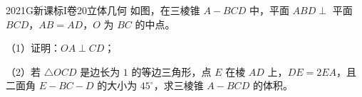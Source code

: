 
\begin{problem}{2021}{G}{新课标I卷}{20}{立体几何}
如图，在三棱锥 $ A-BCD $ 中，平面 $ ABD\perp $ 平面 $ BCD $，$ AB=AD $，$ O $ 为 $ BC $ 的中点。

（1）证明：$ OA\perp CD $；

（2）若 $ \triangle OCD $ 是边长为 $ 1 $ 的等边三角形，点 $ E $ 在棱 $ AD $ 上，$ DE=2EA $，且二面角 $ E-BC-D $ 的大小为 $ 45^\circ $，求三棱锥 $ A-BCD $ 的体积。
\end{problem}

\begin{answer}

\end{answer}

\begin{solutions}

\end{solutions}